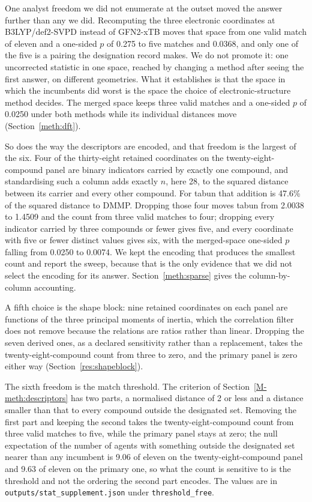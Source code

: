 \documentclass[journal=jacsat,manuscript=suppinfo,margin=1in]{achemso}
\begin{document}
One analyst freedom we did not enumerate at the outset moved the answer
further than any we did. Recomputing the three electronic coordinates at
B3LYP/def2-SVPD instead of GFN2-xTB moves that space from one valid match of
eleven and a one-sided $p$ of 0.275 to five matches and 0.0368, and only one
of the five is a pairing the designation record makes. We do not promote it:
one uncorrected statistic in one space, reached by changing a method after
seeing the first answer, on different geometries. What it establishes is that
the space in which the incumbents did worst is the space the choice of
electronic-structure method decides. The merged space keeps three valid
matches and a one-sided $p$ of 0.0250 under both methods while its individual
distances move (Section~\ref{meth:dft}).

So does the way the descriptors are encoded, and that freedom is the largest
of the six. Four of the thirty-eight retained coordinates on the
twenty-eight-compound panel are binary indicators carried by exactly one
compound, and standardising such a column adds exactly $n$, here 28, to the
squared distance between its carrier and every other compound. For tabun that
addition is 47.6\% of the squared distance to DMMP. Dropping those four moves
tabun from 2.0038 to 1.4509 and the count from three valid matches to four;
dropping every indicator carried by three compounds or fewer gives five, and
every coordinate with five or fewer distinct values gives six, with the
merged-space one-sided $p$ falling from 0.0250 to 0.0074. We kept the encoding
that produces the smallest count and report the sweep, because that is the
only evidence that we did not select the encoding for its answer. Section~\ref{meth:sparse} gives the column-by-column accounting.

A fifth choice is the shape block: nine retained coordinates on each panel are
functions of the three principal moments of inertia, which the correlation
filter does not remove because the relations are ratios rather than linear.
Dropping the seven derived ones, as a declared sensitivity rather than a
replacement, takes the twenty-eight-compound count from three to zero, and the
primary panel is zero either way (Section~\ref{res:shapeblock}).

The sixth freedom is the match threshold. The criterion of
Section~\ref{M-meth:descriptors} has two parts, a normalised distance of 2 or
less and a distance smaller than that to every compound outside the designated
set. Removing the first part and keeping the second takes the
twenty-eight-compound count from three valid matches to five, while the primary
panel stays at zero; the null expectation of the number of agents with
something outside the designated set nearer than any incumbent is 9.06 of
eleven on the twenty-eight-compound panel and 9.63 of eleven on the primary
one, so what the count is sensitive to is the threshold and not the ordering
the second part encodes. The values are in
\texttt{outputs/stat\_supplement.json} under \texttt{threshold\_free}.
\end{document}
